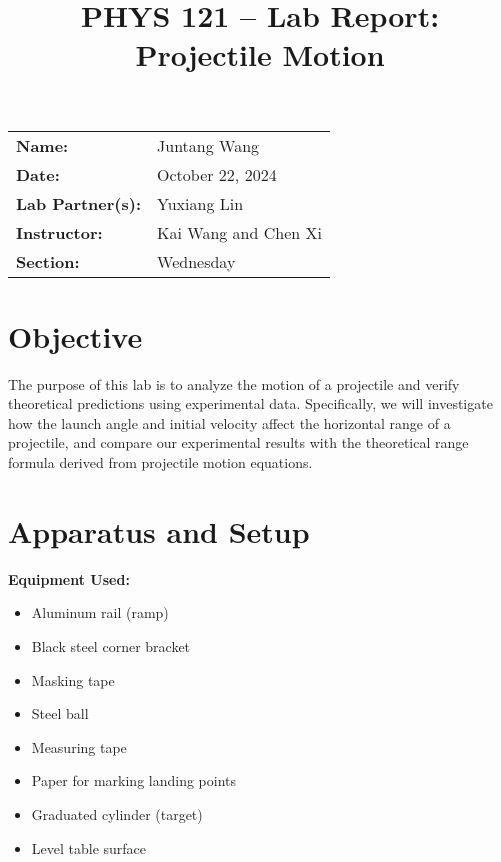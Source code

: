 \documentclass[12pt]{article}
\title{PHYS 121 – Lab Report: Projectile Motion}
\author{}
\date{}
\begin{document}


\maketitle

\begin{center}
\begin{tabular}{ll}
\textbf{Name:} & Juntang Wang \\
\textbf{Date:} & October 22, 2024 \\
\textbf{Lab Partner(s):} & Yuxiang Lin \\
\textbf{Instructor:} & Kai Wang and Chen Xi \\
\textbf{Section:} & Wednesday \\
\end{tabular}
\end{center}

\vspace{0.5in}

\section{Objective}

The purpose of this lab is to analyze the motion of a projectile and verify theoretical predictions using experimental data. Specifically, we will investigate how the launch angle and initial velocity affect the horizontal range of a projectile, and compare our experimental results with the theoretical range formula derived from projectile motion equations.

\section{Apparatus and Setup}

\textbf{Equipment Used:}
\begin{itemize}
    \item Aluminum rail (ramp)
    \item Black steel corner bracket
    \item Masking tape
    \item Steel ball
    \item Measuring tape
    \item Paper for marking landing points
    \item Graduated cylinder (target)
    \item Level table surface
\end{itemize}
\end{document}
